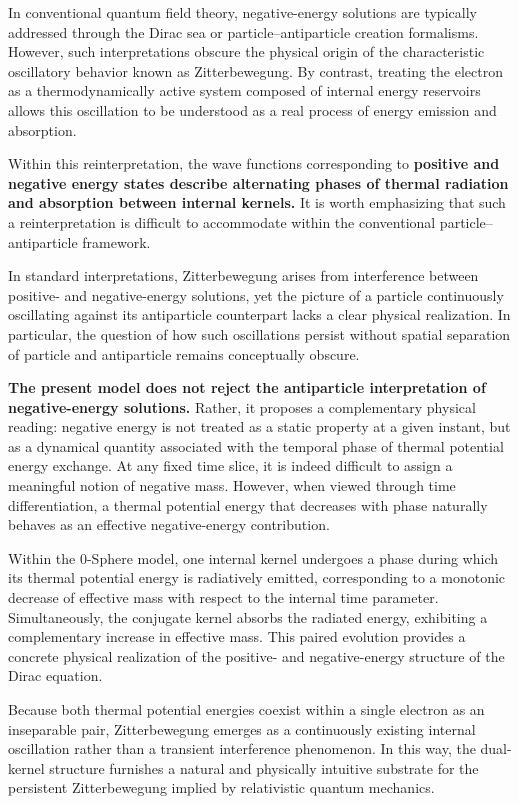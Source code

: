 \documentclass[%
 reprint,
 amsmath,amssymb,
 aps,
 prb,
]{revtex4-2}
\numberwithin{equation}{section}
\begin{document}
In conventional quantum field theory, negative-energy solutions are typically addressed through the Dirac sea or particle--antiparticle creation formalisms. However, such interpretations obscure the physical origin of the characteristic oscillatory behavior known as Zitterbewegung. By contrast, treating the electron as a thermodynamically active system composed of internal energy reservoirs allows this oscillation to be understood as a real process of energy emission and absorption.

Within this reinterpretation, the wave functions corresponding to \textbf{positive and negative energy states describe alternating phases of thermal radiation and absorption between internal kernels.} It is worth emphasizing that such a reinterpretation is difficult to accommodate within the conventional particle--antiparticle framework.

In standard interpretations, Zitterbewegung arises from interference between positive- and negative-energy solutions, yet the picture of a particle continuously oscillating against its antiparticle counterpart lacks a clear physical realization.
In particular, the question of how such oscillations persist without spatial separation of particle and antiparticle remains conceptually obscure.

\textbf{The present model does not reject the antiparticle interpretation of negative-energy solutions.}
Rather, it proposes a complementary physical reading: negative energy is not treated as a static property at a given instant, but as a dynamical quantity associated with the temporal phase of thermal potential energy exchange.
At any fixed time slice, it is indeed difficult to assign a meaningful notion of negative mass.
However, when viewed through time differentiation, a thermal potential energy that decreases with phase naturally behaves as an effective negative-energy contribution.

Within the 0-Sphere model, one internal kernel undergoes a phase during which its thermal potential energy is radiatively emitted, corresponding to a monotonic decrease of effective mass with respect to the internal time parameter.
Simultaneously, the conjugate kernel absorbs the radiated energy, exhibiting a complementary increase in effective mass.
This paired evolution provides a concrete physical realization of the positive- and negative-energy structure of the Dirac equation.

Because both thermal potential energies coexist within a single electron as an inseparable pair, Zitterbewegung emerges as a continuously existing internal oscillation rather than a transient interference phenomenon.
In this way, the dual-kernel structure furnishes a natural and physically intuitive substrate for the persistent Zitterbewegung implied by relativistic quantum mechanics.
\end{document}
